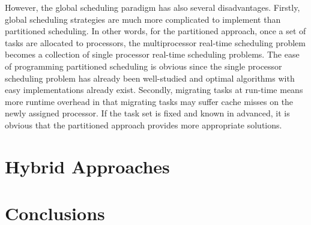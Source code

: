 \documentclass[preprint,12pt]{elsarticle}
\begin{document}
However, the global scheduling paradigm has also several disadvantages. 
Firstly, global scheduling strategies are much more complicated to implement than
partitioned scheduling. 
In other words, for the partitioned approach, once a set of tasks are allocated
to processors, the multiprocessor real-time scheduling problem becomes a
collection of single processor real-time scheduling problems.  The ease of
programming partitioned scheduling is obvious since the single processor
scheduling problem has already been well-studied and optimal algorithms with
easy implementations already exist.
Secondly, migrating tasks at run-time means more runtime overhead in that
migrating tasks may suffer cache misses on the newly assigned processor. If
the task set is fixed and known in advanced, it is obvious that the partitioned
approach provides more appropriate solutions.


\section{Hybrid Approaches} \label{S:5}

\section{Conclusions} \label{S:6}





\newpage








\end{document}
